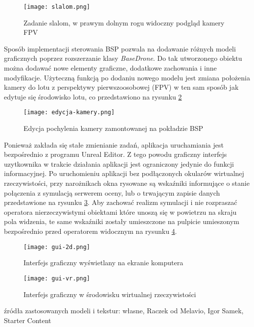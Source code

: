 \begin{figure}[!h]
    \centering \texttt{[image: slalom.png]}
    \caption{Zadanie slalom, w prawym dolnym rogu widoczny podgląd kamery FPV}
    \label{fig:slalom}
\end{figure}

Sposób implementacji sterowania BSP pozwala na dodawanie różnych modeli graficznych poprzez rozszerzanie klasy \emph{BaseDrone}. Do tak utworzonego obiektu można dodawać nowe elementy graficzne, dodatkowe zachowania i inne modyfikacje. Użyteczną funkcją po dodaniu nowego modelu jest zmiana położenia kamery do lotu z perspektywy pierwszoosobowej (FPV) w ten sam sposób jak edytuje się środowisko lotu, co przedstawiono na rysunku \ref{fig:edycja-kamery}

\begin{figure}[!h]
    \centering \texttt{[image: edycja-kamery.png]}
    \caption{Edycja pochylenia kamery zamontowanej na pokładzie BSP}
    \label{fig:edycja-kamery}
\end{figure}

Ponieważ zakłada się stałe zmienianie zadań, aplikacja uruchamiania jest bezpośrednio z programu Unreal Editor. Z tego powodu graficzny interfejs uzytkownika w trakcie działania aplikacji jest ograniczony jedynie do funkcji informacyjnej. Po uruchomieniu aplikacji bez podłączonych okularów wirtualnej rzeczywistości, przy narożnikach okna rysowane są wskaźniki informujące o stanie połączenia z symulacją serwerem oceny, lub o trwającym zapisie danych przedstawione na rysunku \ref{fig:gui-2d}. Aby zachować realizm symulacji i nie rozpraszać operatora nierzeczywistymi obiektami które unoszą się w powietrzu na skraju pola widzenia, te same wskaźniki zostały umieszczone na pulpicie umieszonym bezpośrednio przed operatorem widocznym na rysunku \ref{fig:gui-vr}.

\begin{figure}[!h]
    \centering \texttt{[image: gui-2d.png]}
    \caption{Interfejs graficzny wyświetlany na ekranie komputera}
    \label{fig:gui-2d}
\end{figure}

\begin{figure}[!h]
    \centering \texttt{[image: gui-vr.png]}
    \caption{Interfejs graficzny w środowisku wirtualnej rzeczywistości}
    \label{fig:gui-vr}
\end{figure}

\begin{todo}
    źródła zastosowanych modeli i tekstur: własne, Raczek od Melavio, Igor Samek, Starter Content
\end{todo}

